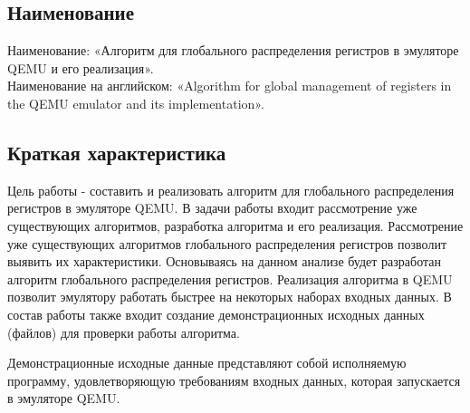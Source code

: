 \subsection{Наименование}
Наименование: «Алгоритм для глобального распределения регистров в эмуляторе QEMU и его реализация». \\
Наименование на английском: «Algorithm for global management of registers in the QEMU emulator and its implementation». \\


\subsection{Краткая характеристика}
    Цель работы - составить и реализовать алгоритм для глобального распределения регистров в эмуляторе QEMU.
    В задачи работы входит рассмотрение уже существующих алгоритмов, разработка алгоритма и его реализация.
    Рассмотрение уже существующих алгоритмов глобального распределения регистров позволит выявить их характеристики. Основываясь на данном анализе будет разработан алгоритм глобального распределения регистров. 
    Реализация алгоритма в QEMU позволит эмулятору работать быстрее на некоторых наборах входных данных.
    В состав работы также входит создание демонстрационных исходных данных (файлов) для проверки работы алгоритма.

\smallskip
Демонстрационные исходные данные представляют собой исполняемую программу, удовлетворяющую требованиям входных данных, которая запускается в эмуляторе QEMU.
